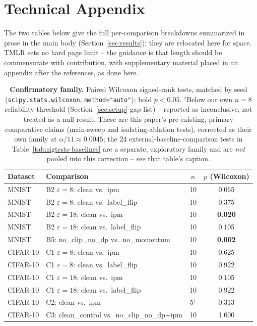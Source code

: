 \documentclass{article}
\begin{document}




\appendix
\section{Technical Appendix}
The two tables below give the full per-comparison breakdowns summarized in
prose in the main body (Section~\ref{sec:results}); they are relocated here
for space. TMLR sets no hard page limit -- the guidance is that length should
be commensurate with contribution, with supplementary material placed in an
appendix after the references, as done here.

\begin{table}[t]
\centering\footnotesize
\begin{tabular}{llcc}
\toprule
Dataset & Comparison & $n$ & $p$ (Wilcoxon) \\
\midrule
MNIST & B2 $\varepsilon{=}8$: clean vs.\ ipm & 10 & 0.065 \\
MNIST & B2 $\varepsilon{=}8$: clean vs.\ label\_flip & 10 & 0.375 \\
MNIST & B2 $\varepsilon{=}18$: clean vs.\ ipm & 10 & \textbf{0.020} \\
MNIST & B2 $\varepsilon{=}18$: clean vs.\ label\_flip & 10 & 0.105 \\
MNIST & B5: no\_clip\_no\_dp vs.\ no\_momentum & 10 & \textbf{0.002} \\
CIFAR-10 & C1 $\varepsilon{=}8$: clean vs.\ ipm & 10 & 0.625 \\
CIFAR-10 & C1 $\varepsilon{=}8$: clean vs.\ label\_flip & 10 & 0.922 \\
CIFAR-10 & C1 $\varepsilon{=}18$: clean vs.\ ipm & 10 & 0.105 \\
CIFAR-10 & C1 $\varepsilon{=}18$: clean vs.\ label\_flip & 10 & 0.922 \\
CIFAR-10 & C2: clean vs.\ ipm & 5$^\dagger$ & 0.313 \\
CIFAR-10 & C3: clean\_control vs.\ no\_clip\_no\_dp+ipm & 10 & 1.000 \\
\bottomrule
\end{tabular}
\caption{\textbf{Confirmatory family.} Paired Wilcoxon signed-rank tests,
matched by seed (\texttt{scipy.stats.wilcoxon}, \texttt{method="auto"}); bold
$p{<}0.05$. $^\dagger$Below our own $n{=}8$ reliability threshold
(Section~\ref{sec:setup} gap list) -- reported as inconclusive, not treated as
a null result. These are this paper's pre-existing, primary comparative
claims (main-sweep and isolating-ablation tests), corrected as their own
family at $\alpha/11\approx0.0045$; the 24 external-baseline-comparison tests
in Table~\ref{tab:sigtests-baselines} are a separate, exploratory family and
are \emph{not} pooled into this correction -- see that table's caption.}
\label{tab:sigtests}
\end{table}
\end{document}
